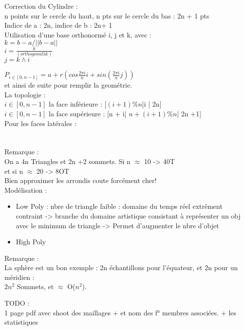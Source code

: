 
Correction du Cylindre : \\
n points sur le cercle du haut, n pts sur le cercle du bas : 2n + 1 pts\\
Indice de a : 2n, indice de b : 2n+ 1\\

Utilisation d'une base orthonormé i, j et k, avec :\\
$k = b-a/||b - a||$\\
$i = \frac{k}{(orthogonal à k)}$\\
$j = k ∧ i$

$P_{i \in [0, n-1]} = a + r(cos\frac{2\pi i}{n} i + sin(\frac{2\pi i}{n}j))$\\
et ainsi de suite pour remplir la geométrie.\\

La topologie :\\
$i \in[0, n-1]$ la face inférieure : [$(i+1)\%n$|i | 2n]\\
$i \in[0, n-1]$ la face supérieure : [n + i| $n +(i+1)\%n$| 2n +1]\\

Pour les faces latérales :\\
[i| $(i+1)\%n$| $n + (i+1)\%n$]\\
[i| $n+ (i+1)\%n$ | $n + i$]\\


Remarque :\\
On a 4n Triangles et 2n +2 sommets. Si n $\approx$ 10 -> 40T\\
et si n $\approx$ 20 -> 8OT\\
Bien approximer les arrondis coute forcément cher!\\

Modélisation :
\begin{itemize}
	\item Low Poly : nbre de triangle faible : domaine du temps réel extrêment contraint -> branche du domaine artistique consistant à représenter un obj avec le minimum de triangle -> Permet d'augmenter le nbre d'objet
	\item High Poly
\end{itemize}

Remarque : \\
La sphère est un bon exemple : 2n échantillons pour l'équateur, et 2n pour un méridien :\\
$2n^2$ Sommets, et $\approx $ O($n^2$).

TODO : \\
1 page pdf avec shoot des maillages + et nom des f° membres associées. + les statistiques

